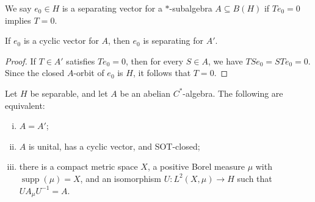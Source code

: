 \documentclass[10pt]{mypackage}
\begin{document}
\begin{definition}
  We say $e_0\in H$ is a separating vector for a $\ast$-subalgebra $A\subseteq B(H)$ if $Te_0 = 0$ implies $T = 0$.
\end{definition}
\begin{proposition}
If $e_0$ is a cyclic vector for $A$, then $e_0$ is separating for $A'$.
\end{proposition}
\begin{proof}
  If $T\in A'$ satisfies $Te_0 = 0$, then for every $S\in A$, we have $TSe_0 = STe_0 = 0$. Since the closed $A$-orbit of $e_0$ is $H$, it follows that $T = 0$.
\end{proof}
\begin{theorem}
  Let $H$ be separable, and let $A$ be an abelian $C^{\ast}$-algebra. The following are equivalent:
  \begin{enumerate}[(i)]
    \item $A = A'$;
    \item $A$ is unital, has a cyclic vector, and SOT-closed;
    \item there is a compact metric space $X$, a positive Borel measure $\mu$ with $\operatorname{supp}\left( \mu \right) = X$, and an isomorphism $U\colon L^2\left( X,\mu \right)\to H$ such that $U A_{\mu} U^{-1} = A$.
  \end{enumerate}
\end{theorem}
\end{document}

